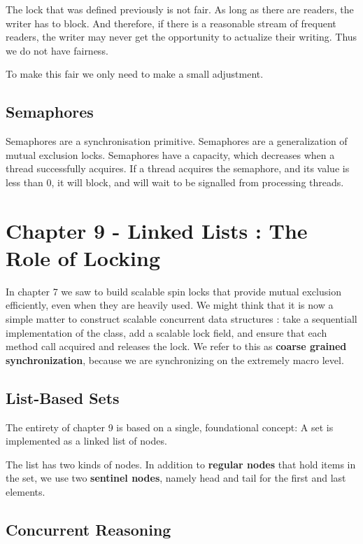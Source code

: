 \documentclass[11pt]{article}
\begin{document}
The lock that was defined previously is not fair. As long as there are readers, the writer has
to block. And therefore, if there is a reasonable stream of frequent readers, the writer may
never get the opportunity to actualize their writing. Thus we do not have fairness.

To make this fair we only need to make a small adjustment.

\subsection{Semaphores}
\label{sec:orgheadline18}

Semaphores are a synchronisation primitive. Semaphores are a generalization of mutual exclusion
locks. Semaphores have a capacity, which decreases when a thread successfully acquires. If a 
thread acquires the semaphore, and its value is less than 0, it will block, and will wait to be
signalled from processing threads.

\section{Chapter 9 - Linked Lists : The Role of Locking}
\label{sec:orgheadline27}

In chapter 7 we saw to build scalable spin locks that provide mutual exclusion efficiently, even 
when they are heavily used. We might think that it is now a simple matter to construct scalable
concurrent data structures : take a sequentiall implementation of the class, add a scalable lock
field, and ensure that each method call acquired and releases the lock. We refer to this as
\textbf{coarse grained synchronization}, because we are synchronizing on the extremely macro level.

\subsection{List-Based Sets}
\label{sec:orgheadline20}

The entirety of chapter 9 is based on a single, foundational concept: A set is implemented as a
linked list of nodes.

The list has two kinds of nodes. In addition to \textbf{regular nodes} that hold items in the set, we 
use two \textbf{sentinel nodes}, namely head and tail for the first and last elements.

\subsection{Concurrent Reasoning}
\label{sec:orgheadline21}
\end{document}
